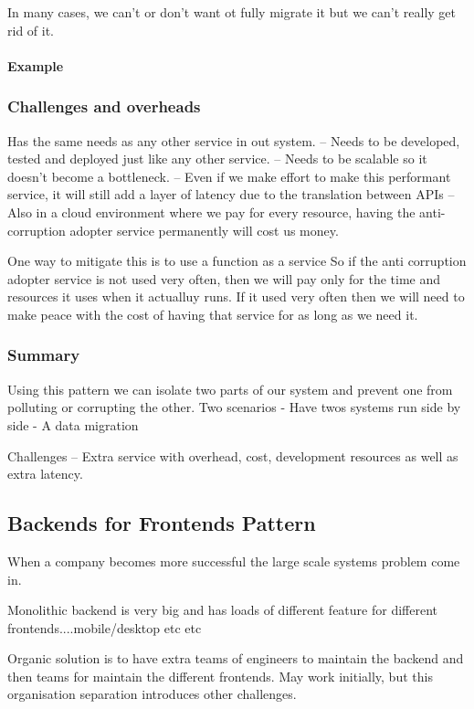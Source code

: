 \documentclass[a4paper, 11pt]{book}
\begin{document}
    In many cases, we can't or don't want ot fully migrate it but we can't really get rid of it.

    \paragraph{Example}

    \subsubsection{Challenges and overheads}
    Has the same needs as any other service in out system.
    -- Needs to be developed, tested and deployed just like any other service.
    -- Needs to be scalable so it doesn't become a bottleneck.
    -- Even if we make effort to make this performant service, it will still add a layer of latency due to the translation between APIs
    -- Also in a cloud environment where we pay for every resource, having the anti-corruption adopter service permanently will cost us money.

    One way to mitigate this is to use a function as a service
    So if the anti corruption adopter service is not used very often, then we will pay only for the time and resources it uses when it actualluy runs.
    If it used very often then we will need to make peace with the cost of having that service for as long as we need it.

    \subsubsection{Summary}
    Using this pattern we can isolate two parts of our system and prevent one from polluting or corrupting the other.
    Two scenarios
    - Have twos systems run side by side
    - A data migration

    Challenges
    -- Extra service with overhead, cost, development resources as well as extra latency.

    \subsection{Backends for Frontends Pattern}
    When a company becomes more successful the large scale systems problem come in.

    Monolithic backend is very big and has loads of different feature for different frontends....mobile/desktop etc etc

    Organic solution is to have extra teams of engineers to maintain the backend and then teams for maintain the different frontends.
    May work initially, but this organisation separation introduces other challenges.
\end{document}
